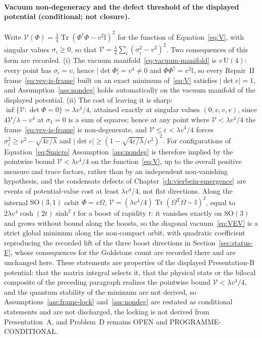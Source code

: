 \paragraph{Vacuum non-degeneracy and the defect threshold of the displayed potential (conditional; not closure).}
Write \(\mathcal V(\Phi)=\tfrac{\lambda}4\operatorname{Tr}(\Phi^\dagger\Phi-v^2\mathbb I)^2\) for the function of Equation~\eqref{eq:V}, with singular values \(\sigma_i\ge0\), so that \(\mathcal V=\tfrac{\lambda}4\sum_i(\sigma_i^2-v^2)^2\). Two consequences of this form are recorded. (i) The vacuum manifold~\eqref{eq:vacuum-manifold} is \(v\,\mathrm U(4)\): every point has \(\sigma_i=v\), hence \(|\det\Phi|=v^4\ne0\) and \(\Phi\Phi^\dagger=v^2\mathbb I\), so every Repair~II frame~\eqref{eq:vev-is-frame} built on an exact minimum of~\eqref{eq:V} satisfies \(|\det e|=1\), and Assumption~\ref{ass:nondeg} holds automatically on the vacuum manifold of the displayed potential. (ii) The cost of leaving it is sharp: \(\inf\{\mathcal V:\det\Phi=0\}=\lambda v^4/4\), attained exactly at singular values \((0,v,v,v)\), since \(4\mathcal V/\lambda-v^4\) at \(\sigma_1=0\) is a sum of squares; hence at any point where \(\mathcal V<\lambda v^4/4\) the frame~\eqref{eq:vev-is-frame} is non-degenerate, and \(\mathcal V\le\varepsilon<\lambda v^4/4\) forces \(\sigma_i^2\ge v^2-\sqrt{4\varepsilon/\lambda}\) and \(|\det e|\ge(1-\sqrt{4\varepsilon/\lambda}/v^2)^2\). For configurations of Equation~\eqref{eq:Smicro} Assumption~\ref{ass:nondeg} is therefore implied by the pointwise bound \(\mathcal V<\lambda v^4/4\) on the function~\eqref{eq:V}, up to the overall positive measure and trace factors, rather than by an independent non-vanishing hypothesis, and the condensate defects of Chapter~\ref{ch:vierbein-emergence} are events of potential-value cost at least \(\lambda v^4/4\), not flat directions. Along the internal \(\mathrm{SO}(3,1)\) orbit \(\Phi=v\Omega\), \(\mathcal V=(\lambda v^4/4)\operatorname{Tr}(\Omega^{\mathrm T}\Omega-\mathbb I)^2\), equal to \(2\lambda v^4\cosh(2t)\sinh^2t\) for a boost of rapidity \(t\): it vanishes exactly on \(\mathrm{SO}(3)\) and grows without bound along the boosts, so the diagonal vacuum~\eqref{eq:VEV} is a strict global minimum along the non-compact orbit, with quadratic coefficient reproducing the recorded lift of the three boost directions in Section~\ref{sec:status-F}, whose consequences for the Goldstone count are recorded there and are unchanged here. These statements are properties of the displayed Presentation-B potential: that the matrix integral selects it, that the physical state or the bilocal composite of the preceding paragraph realizes the pointwise bound \(\mathcal V<\lambda v^4/4\), and the quantum stability of the minimum are not derived, so Assumptions~\ref{ass:frame-lock} and~\ref{ass:nondeg} are restated as conditional statements and are not discharged, the locking is not derived from Presentation~A, and Problem~D remains OPEN and PROGRAMME-CONDITIONAL.


